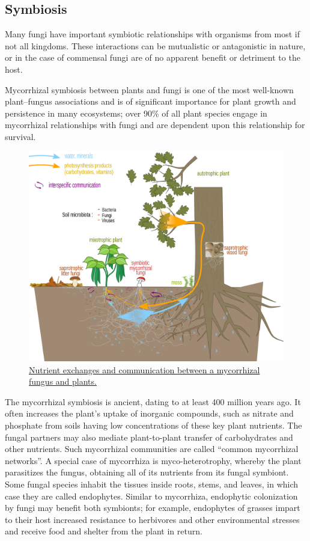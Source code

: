 \hypertarget{symbiosis}{%
\subsection{Symbiosis}\label{symbiosis}}

Many fungi have important symbiotic relationships with organisms from most if not all kingdoms. These interactions can be mutualistic or antagonistic in nature, or in the case of commensal fungi are of no apparent benefit or detriment to the host.

Mycorrhizal symbiosis between plants and fungi is one of the most well-known plant--fungus associations and is of significant importance for plant growth and persistence in many ecosystems; over 90\% of all plant species engage in mycorrhizal relationships with fungi and are dependent upon this relationship for survival.



\begin{figure}

{\centering \includegraphics[width=0.7\linewidth]{./figures/fungi/Mycorrhizal_network} 

}

\caption{\href{https://commons.wikimedia.org/wiki/File:Mycorrhizal_network.svg}{Nutrient exchanges and communication between a mycorrhizal fungus and plants.}}\label{fig:mycorhiza}
\end{figure}

The mycorrhizal symbiosis is ancient, dating to at least 400 million years ago. It often increases the plant's uptake of inorganic compounds, such as nitrate and phosphate from soils having low concentrations of these key plant nutrients. The fungal partners may also mediate plant-to-plant transfer of carbohydrates and other nutrients. Such mycorrhizal communities are called ``common mycorrhizal networks''. A special case of mycorrhiza is myco-heterotrophy, whereby the plant parasitizes the fungus, obtaining all of its nutrients from its fungal symbiont. Some fungal species inhabit the tissues inside roots, stems, and leaves, in which case they are called endophytes. Similar to mycorrhiza, endophytic colonization by fungi may benefit both symbionts; for example, endophytes of grasses impart to their host increased resistance to herbivores and other environmental stresses and receive food and shelter from the plant in return.

